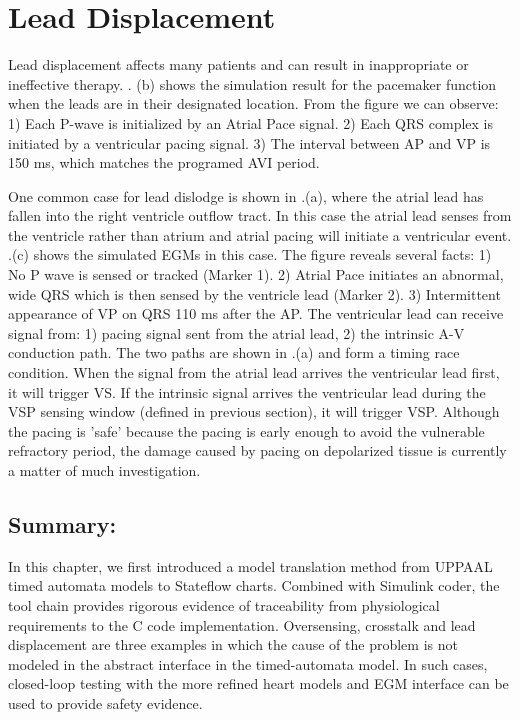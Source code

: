 \section{Lead Displacement}
Lead displacement affects many patients and can result in inappropriate or ineffective therapy. . (b) shows the simulation result for the pacemaker function when the leads are in their designated location. From the figure we can observe: 1) Each P-wave is initialized by an Atrial Pace signal. 2) Each QRS complex is initiated by a ventricular pacing signal. 3) The interval between AP and VP is 150 ms, which matches the programed AVI period.


One common case for lead dislodge is shown in .(a), where the atrial lead has fallen into the right ventricle outflow tract. In this case the atrial lead senses from the ventricle rather than atrium and atrial pacing will initiate a ventricular event. .(c) shows the simulated EGMs in this case. The figure reveals several facts: 1) No P wave is sensed or tracked (Marker 1). 2) Atrial Pace initiates an abnormal, wide QRS which is then sensed by the ventricle lead (Marker 2). 3) Intermittent appearance of VP on QRS 110 ms after the AP. The ventricular lead can receive signal from: 1) pacing signal sent from the atrial lead, 2) the intrinsic A-V conduction path. The two paths are shown in .(a) and form a timing race condition. When the signal from the atrial lead arrives the ventricular lead first, it will trigger VS. If the intrinsic signal arrives the ventricular lead during the VSP sensing window (defined in previous section), it will trigger VSP. Although the pacing is 'safe' because the pacing is early enough to avoid the vulnerable refractory period, the damage caused by pacing on depolarized tissue is currently a matter of much investigation.\\

\subsection{Summary:}
In this chapter, we first introduced a model translation method from UPPAAL timed automata models to Stateflow charts. Combined with Simulink coder, the tool chain provides rigorous evidence of traceability from physiological requirements to the C code implementation. Oversensing, crosstalk and lead displacement are three examples in which the cause of the problem is not modeled in the abstract interface in the timed-automata model. In such cases, closed-loop testing with the more refined heart models and EGM interface can be used to provide safety evidence.

